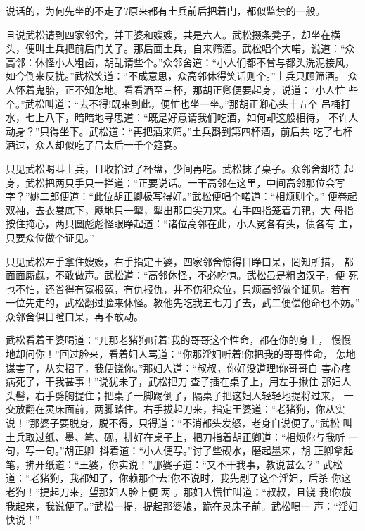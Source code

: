 说话的，为何先坐的不走了?原来都有土兵前后把着门，都似监禁的一般。

且说武松请到四家邻舍，并王婆和嫂嫂，共是六人。武松掇条凳子，却坐在横
头，便叫土兵把前后门关了。那后面土兵，自来筛酒。武松唱个大喏，说道：“众
高邻：休怪小人粗卤，胡乱请些个。”众邻舍道：“小人们都不曾与都头洗泥接风，
如今倒来反扰。”武松笑道：“不成意思，众高邻休得笑话则个。”土兵只顾筛酒。
众人怀着鬼胎，正不知怎地。看看酒至三杯，那胡正卿便要起身，说道：“小人忙
些个。”武松叫道：“去不得!既来到此，便忙也坐一坐。”那胡正卿心头十五个
吊桶打水，七上八下，暗暗地寻思道：“既是好意请我们吃酒，如何却这般相待，
不许人动身？”只得坐下。武松道：“再把酒来筛。”土兵斟到第四杯酒，前后共
吃了七杯酒过，众人却似吃了吕太后一千个筵宴。

只见武松喝叫土兵，且收拾过了杯盘，少间再吃。武松抹了桌子。众邻舍却待
起身，武松把两只手只一拦道：“正要说话。一干高邻在这里，中间高邻那位会写
字？”姚二郎便道：“此位胡正卿极写得好。”武松便唱个喏道：“相烦则个。”
便卷起双袖，去衣裳底下，飕地只一掣，掣出那口尖刀来。右手四指笼着刀靶，大
母指按住掩心，两只圆彪彪怪眼睁起道：“诸位高邻在此，小人冤各有头，债各有
主，只要众位做个证见。”

只见武松左手拿住嫂嫂，右手指定王婆，四家邻舍惊得目睁口呆，罔知所措，
都面面厮觑，不敢做声。武松道：“高邻休怪，不必吃惊。武松虽是粗卤汉子，便
死也不怕，还省得有冤报冤，有仇报仇，并不伤犯众位，只烦高邻做个证见。若有
一位先走的，武松翻过脸来休怪。教他先吃我五七刀了去，武二便偿他命也不妨。”
众邻舍俱目瞪口呆，再不敢动。

武松看着王婆喝道：“兀那老猪狗听着!我的哥哥这个性命，都在你的身上，
慢慢地却问你！”回过脸来，看着妇人骂道：“你那淫妇听着!你把我的哥哥性命，
怎地谋害了，从实招了，我便饶你。”那妇人道：“叔叔，你好没道理!你哥哥自
害心疼病死了，干我甚事！”说犹未了，武松把刀查子插在桌子上，用左手揪住
那妇人头髻，右手劈胸提住；把桌子一脚踢倒了，隔桌子把这妇人轻轻地提将过来，
一交放翻在灵床面前，两脚踏住。右手拔起刀来，指定王婆道：“老猪狗，你从实
说！”那婆子要脱身，脱不得，只得道：“不消都头发怒，老身自说便了。”武松
叫土兵取过纸、墨、笔、砚，排好在桌子上，把刀指着胡正卿道：“相烦你与我听
一句，写一句。”胡正卿抖着道：“小人便写。”讨了些砚水，磨起墨来，胡
正卿拿起笔，拂开纸道：“王婆，你实说！”那婆子道：“又不干我事，教说甚么？”
武松道：“老猪狗，我都知了，你赖那个去!你不说时，我先剐了这个淫妇，后杀
你这老狗！”提起刀来，望那妇人脸上便两。那妇人慌忙叫道：“叔叔，且饶
我!你放我起来，我说便了。”武松一提，提起那婆娘，跪在灵床子前。武松喝一
声：“淫妇快说！”

